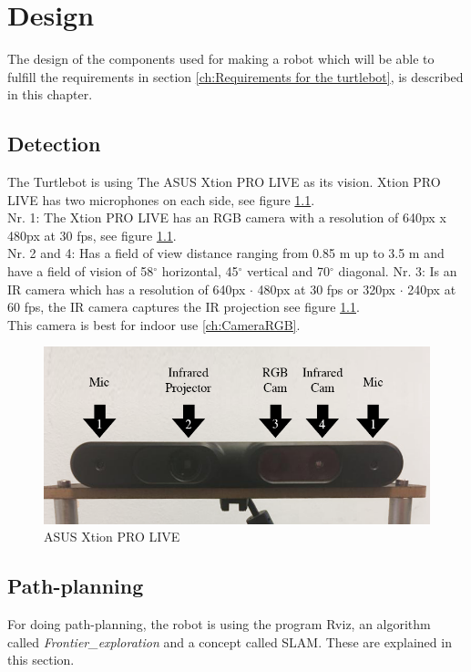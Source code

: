 \chapter{Design}
\label{ch:design}
The design of the components used for making a robot which will be able to fulfill the requirements in section \ref{ch:Requirements for the turtlebot}, is described in this chapter.

%
% 
%
%

\section{Detection} \label{ch:designDetection}
The Turtlebot is using The ASUS Xtion PRO LIVE as its vision. Xtion PRO LIVE has two microphones on each side, see figure \ref{fig:asusCamera}.\\

Nr. 1: The Xtion PRO LIVE has an RGB camera with a resolution of 640px x 480px at 30 fps, see figure \ref{fig:asusCamera}.\\ 
Nr. 2 and 4: Has a field of view distance ranging from 0.85 m up to 3.5 m and have a field of vision of 58${^\circ}$ horizontal, 45${^\circ}$ vertical and 70${^\circ}$ diagonal.
Nr. 3: Is an IR camera which has a resolution of 640px $\cdot$ 480px at 30 fps or 320px $\cdot$ 240px at 60 fps, the IR camera captures the IR projection see figure \ref{fig:asusCamera}.\\
This camera is best for indoor use \ref{ch:CameraRGB}.
\begin{figure}[h!]
    \centering
    \includegraphics[width=.7\textwidth]{figures/camera02.png}
    \caption{ASUS Xtion PRO LIVE} 
    \label{fig:asusCamera} 
\end{figure}
\newpage


%
%
%
%

\section{Path-planning} \label{ch:designPathplanning}
For doing path-planning, the robot is using the program Rviz, an algorithm called \textit{Frontier\_exploration} and a concept called SLAM. These are explained in this section.

